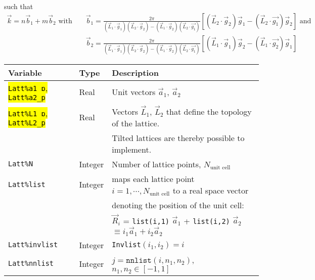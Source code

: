 such that 
\begin{eqnarray}
\label{k.quant.eq}
     \vec{k} =  n \vec{b}_1  + m \vec{b}_2 \text{  with  }   & &   \vec{b}_1 = \frac{2 \pi}{ (\vec{L}_1 \cdot \vec{g}_1)  (\vec{L}_2 \cdot  \vec{g}_2 )  - (\vec{L}_1 \cdot \vec{g}_2) (\vec{L}_2  \cdot \vec{g_1} ) }   \left[  (\vec{L}_2 \cdot  \vec{g}_2) \vec{g}_1 -   (\vec{L}_2  \cdot \vec{g_1} ) \vec{g}_2 \right] \text{   and  } \nonumber \\ 
        & & \vec{b}_2 = \frac{2 \pi}{ (\vec{L}_1 \cdot \vec{g}_1)  (\vec{L}_2 \cdot  \vec{g}_2 )  - (\vec{L}_1 \cdot \vec{g}_2) (\vec{L}_2  \cdot \vec{g_1} ) }   
           \left[  (\vec{L}_1 \cdot  \vec{g}_1) \vec{g}_2 -   (\vec{L}_1  \cdot \vec{g_2} ) \vec{g}_1 \right] 
\end{eqnarray}

%
\begin{table}[h]
   \begin{tabular}{@{} l l l @{}}\toprule
    Variable  & Type & Description \\\midrule
     \hl{\texttt{Latt\%a1\_p}, \texttt{Latt\%a2\_p}}   & Real     & Unit vectors $\vec{a}_1$,  $\vec{a}_2$ \\ 
     \hl{\texttt{Latt\%L1\_p}, \texttt{Latt\%L2\_p}}   & Real     & Vectors $\vec{L}_1$, $\vec{L}_2$ that define the topology of the  lattice. \\
     									  &              &  Tilted lattices are  thereby possible to implement.  \\
    \texttt{Latt\%N}                                                 &   Integer &  Number of lattice points, $N_{\text{unit cell}}$   \\
    \texttt{Latt\%list}                                               & Integer &  maps each lattice point $i=1,\cdots, N_{\text{unit cell}}$ to a real space vector\\ 
                                                                             &   &  denoting the position of the unit cell: \\
                                                                             &   & $\vec{R}_i$ = \texttt{list(i,1)} $\vec{a}_1$ +  \texttt{list(i,2)} $\vec{a}_2$  $  \equiv i_1  \vec{a}_1 + i_2  \vec{a}_2 $ \\
    \texttt{Latt\%invlist}                                        &  Integer &   \texttt{Invlist}$(i_1,i_2) = i $ \\
    \texttt{Latt\%nnlist}                                         &  Integer &   $j = \texttt{nnlist} (i, n_1, n_2) $,  $n_1, n_2 \in [-1,1] $ \\

\end{tabular}
\end{table}

